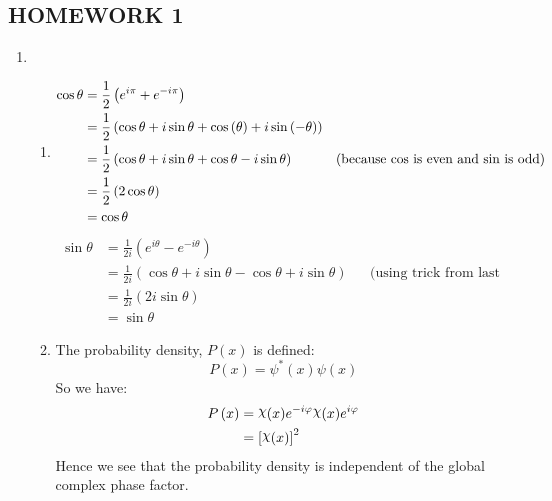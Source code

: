 \documentclass[10pt]{article}
\DeclareRobustCommand{\rchi}{{\mathpalette\irchi\relax}}
\newcommand{\irchi}[2]{\raisebox{\depth}{$#1\chi$}} %
\begin{document}

\begin{centering}
  \section*{HOMEWORK 1}
\end{centering}

\begin{enumerate}
  \item
    \begin{enumerate}
      \item 
      \begin{align*}
      \cos \theta &= \frac{1}{2} \left( e ^ {i \pi} + e ^ {-i\pi} \right) \\
      &= \frac{1}{2} \left( \cos \theta + i \sin \theta + \cos \left( \theta \right) + i \sin \left( - \theta \right) \right) \\
      &= \frac{1}{2} \left( \cos \theta + i \sin \theta + \cos \theta - i \sin \theta \right) && \text{(because $ \cos $ is even and $ \sin $ is odd)} \\
      &= \frac{1}{2} \left( 2 \cos \theta \right) \\
      &= \cos \theta
      \end{align*}
      \begin{align*}
      \sin \theta &= \frac{1}{2i} \left( e ^ {i\theta} - e ^ {-i\theta} \right) \\
                  &= \frac{1}{2i} \left( \cos \theta + i \sin \theta - \cos \theta + i \sin \theta \right) && \text{(using trick from last derivation)}\\
                  &= \frac{1}{2i} \left( 2i \sin \theta \right) \\
                  &= \sin \theta
      \end{align*}
    \item 
      The probability density, $ P \left( x \right) $ is defined:
      \begin{equation*}
        P \left( x \right) = \psi ^* \left( x \right)\psi \left( x \right)
      \end{equation*}
      So we have:
      \begin{align*}
        P \left( x \right) &= \rchi (x) e ^ {-i \varphi } \rchi (x) e ^ {i \varphi } \\
                           &= \left[ \rchi (x)  \right] ^2
      \end{align*}
      Hence we see that the probability density is independent of the global complex phase factor.

\end{enumerate}
\end{enumerate}
\end{document}
